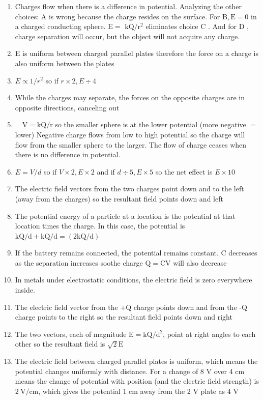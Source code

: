 \begin{enumerate}
\begin{enumerate}
  \item Charges flow when there is a difference in potential. Analyzing the other choices: A is wrong because the charge resides on the surface. For $\mathrm{B}, \mathrm{E}=0$ in a charged conducting sphere. $\mathrm{E}=$ $\mathrm{kQ} / \mathrm{r}^{2}$ eliminates choice C . And for D , charge separation will occur, but the object will not acquire any charge.
  \item E is uniform between charged parallel plates therefore the force on a charge is also uniform between the plates
  \item $E \propto 1 / r^{2}$ so if $r \times 2, E \div 4$
  \item While the charges may separate, the forces on the opposite charges are in opposite directions, canceling out
  \item $\quad \mathrm{V}=\mathrm{kQ} / \mathrm{r}$ so the smaller sphere is at the lower potential (more negative $=$ lower) Negative charge flows from low to high potential so the charge will flow from the smaller sphere to the larger. The flow of charge ceases when there is no difference in potential.
  \item $E=V / d$ so if $V \times 2, E \times 2$ and if $d \div 5, E \times 5$ so the net effect is $E \times 10$
  \item The electric field vectors from the two charges point down and to the left (away from the charges) so the resultant field points down and left
  \item The potential energy of a particle at a location is the potential at that location times the charge. In this case, the potential is $\mathrm{kQ} / \mathrm{d}+\mathrm{kQ} / \mathrm{d}=(2 \mathrm{kQ} / \mathrm{d})$
  \item If the battery remains connected, the potential remains constant. C decreases as the separation increases soothe charge $\mathrm{Q}=\mathrm{CV}$ will also decrease
  \item In metals under electrostatic conditions, the electric field is zero everywhere inside.
  \item The electric field vector from the +Q charge points down and from the -Q charge points to the right so the resultant field points down and right
  \item The two vectors, each of magnitude $\mathrm{E}=\mathrm{kQ} / \mathrm{d}^{2}$, point at right angles to each other so the resultant field is $\sqrt{2} \mathrm{E}$
  \item The electric field between charged parallel plates is uniform, which means the potential changes uniformly with distance. For a change of 8 V over 4 cm means the change of potential with position (and the electric field strength) is $2 \mathrm{~V} / \mathrm{cm}$, which gives the potential 1 cm away from the 2 V plate as 4 V

\end{enumerate}
\end{enumerate}
